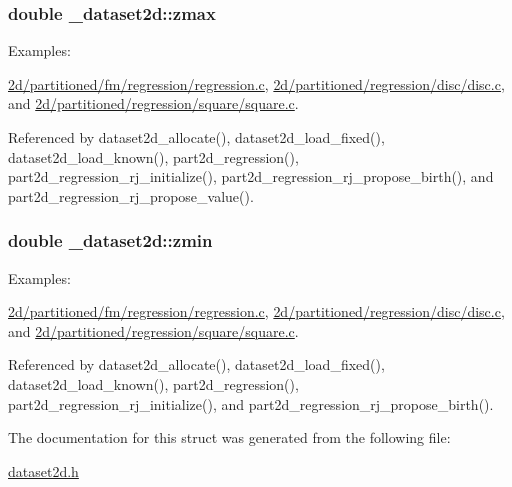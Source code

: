 \subsubsection[{\texorpdfstring{zmax}{zmax}}]{\setlength{\rightskip}{0pt plus 5cm}double \+\_\+dataset2d\+::zmax}\hypertarget{struct__dataset2d_a7fe5f9291be9830530ddd01fcf8884dd}{}\label{struct__dataset2d_a7fe5f9291be9830530ddd01fcf8884dd}
\begin{Desc}
\item[Examples\+: ]\par
\hyperlink{2d_2partitioned_2fm_2regression_2regression_8c-example}{2d/partitioned/fm/regression/regression.\+c}, \hyperlink{2d_2partitioned_2regression_2disc_2disc_8c-example}{2d/partitioned/regression/disc/disc.\+c}, and \hyperlink{2d_2partitioned_2regression_2square_2square_8c-example}{2d/partitioned/regression/square/square.\+c}.\end{Desc}


Referenced by dataset2d\+\_\+allocate(), dataset2d\+\_\+load\+\_\+fixed(), dataset2d\+\_\+load\+\_\+known(), part2d\+\_\+regression(), part2d\+\_\+regression\+\_\+rj\+\_\+initialize(), part2d\+\_\+regression\+\_\+rj\+\_\+propose\+\_\+birth(), and part2d\+\_\+regression\+\_\+rj\+\_\+propose\+\_\+value().

\subsubsection[{\texorpdfstring{zmin}{zmin}}]{\setlength{\rightskip}{0pt plus 5cm}double \+\_\+dataset2d\+::zmin}\hypertarget{struct__dataset2d_ab0a7953680cd29d50a435f14749f0d81}{}\label{struct__dataset2d_ab0a7953680cd29d50a435f14749f0d81}
\begin{Desc}
\item[Examples\+: ]\par
\hyperlink{2d_2partitioned_2fm_2regression_2regression_8c-example}{2d/partitioned/fm/regression/regression.\+c}, \hyperlink{2d_2partitioned_2regression_2disc_2disc_8c-example}{2d/partitioned/regression/disc/disc.\+c}, and \hyperlink{2d_2partitioned_2regression_2square_2square_8c-example}{2d/partitioned/regression/square/square.\+c}.\end{Desc}


Referenced by dataset2d\+\_\+allocate(), dataset2d\+\_\+load\+\_\+fixed(), dataset2d\+\_\+load\+\_\+known(), part2d\+\_\+regression(), part2d\+\_\+regression\+\_\+rj\+\_\+initialize(), and part2d\+\_\+regression\+\_\+rj\+\_\+propose\+\_\+birth().



The documentation for this struct was generated from the following file\+:\begin{DoxyCompactItemize}
\item 
\hyperlink{dataset2d_8h}{dataset2d.\+h}\end{DoxyCompactItemize}
